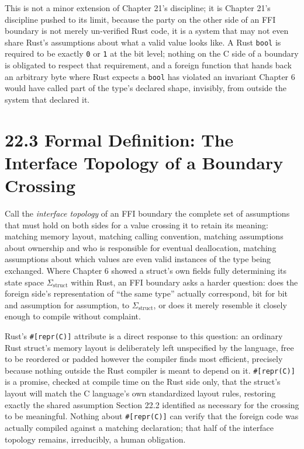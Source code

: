 \documentclass[11pt]{book}
\begin{document}
This is not a minor extension of Chapter 21's discipline; it is Chapter 21's discipline pushed to its limit, because the party on the other side of an FFI boundary is not merely un-verified Rust code, it is a system that may not even share Rust's assumptions about what a valid value looks like. A Rust \texttt{bool} is required to be exactly \texttt{0} or \texttt{1} at the bit level; nothing on the C side of a boundary is obligated to respect that requirement, and a foreign function that hands back an arbitrary byte where Rust expects a \texttt{bool} has violated an invariant Chapter 6 would have called part of the type's declared shape, invisibly, from outside the system that declared it.

\section*{22.3 Formal Definition: The Interface Topology of a Boundary Crossing}

Call the \emph{interface topology} of an FFI boundary the complete set of assumptions that must hold on both sides for a value crossing it to retain its meaning: matching memory layout, matching calling convention, matching assumptions about ownership and who is responsible for eventual deallocation, matching assumptions about which values are even valid instances of the type being exchanged. Where Chapter 6 showed a struct's own fields fully determining its state space $\Sigma_{\text{struct}}$ within Rust, an FFI boundary asks a harder question: does the foreign side's representation of ``the same type'' actually correspond, bit for bit and assumption for assumption, to $\Sigma_{\text{struct}}$, or does it merely resemble it closely enough to compile without complaint.

Rust's \texttt{\#[repr(C)]} attribute is a direct response to this question: an ordinary Rust struct's memory layout is deliberately left unspecified by the language, free to be reordered or padded however the compiler finds most efficient, precisely because nothing outside the Rust compiler is meant to depend on it. \texttt{\#[repr(C)]} is a promise, checked at compile time on the Rust side only, that the struct's layout will match the C language's own standardized layout rules, restoring exactly the shared assumption Section 22.2 identified as necessary for the crossing to be meaningful. Nothing about \texttt{\#[repr(C)]} can verify that the foreign code was actually compiled against a matching declaration; that half of the interface topology remains, irreducibly, a human obligation.
\end{document}
